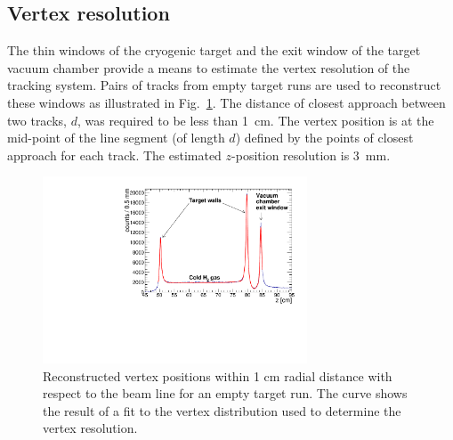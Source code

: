 \subsection{Vertex resolution}

The thin windows of the cryogenic target and the exit window of the target
vacuum chamber provide a means to estimate the 
vertex resolution of the tracking system.  Pairs of tracks from empty target runs are used to reconstruct these windows as illustrated in 
Fig.~\ref{fig:z-vertex}. The distance of closest approach between two tracks, $d$, was required to be less than 1~cm. The vertex position 
is at the mid-point of the line segment (of length $d$) defined by the points of closest approach for each track.
The estimated $z$-position resolution is 3~mm.

\begin{figure}[tbp]
\begin{center}
\includegraphics[width=0.7\textwidth]{figures/ZVertex.pdf}  
\caption{\label{fig:z-vertex} Reconstructed vertex positions within 1 cm radial
 distance with respect to the beam line for an empty target run.  The curve shows the result of a fit to the vertex distribution used to determine the vertex
resolution. 
}   
\end{center}  
\end{figure}


